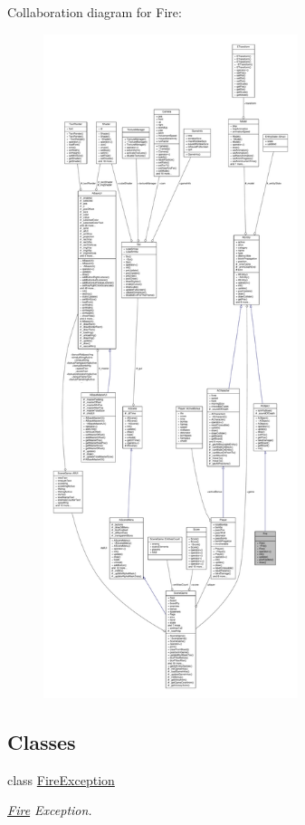 Collaboration diagram for Fire\+:
\nopagebreak
\begin{figure}[H]
\begin{center}
\leavevmode
\includegraphics[height=550pt]{class_fire__coll__graph}
\end{center}
\end{figure}
\subsection*{Classes}
\begin{DoxyCompactItemize}
\item 
class \hyperlink{class_fire_1_1_fire_exception}{Fire\+Exception}
\begin{DoxyCompactList}\small\item\em \hyperlink{class_fire}{Fire} Exception. \end{DoxyCompactList}\end{DoxyCompactItemize}
